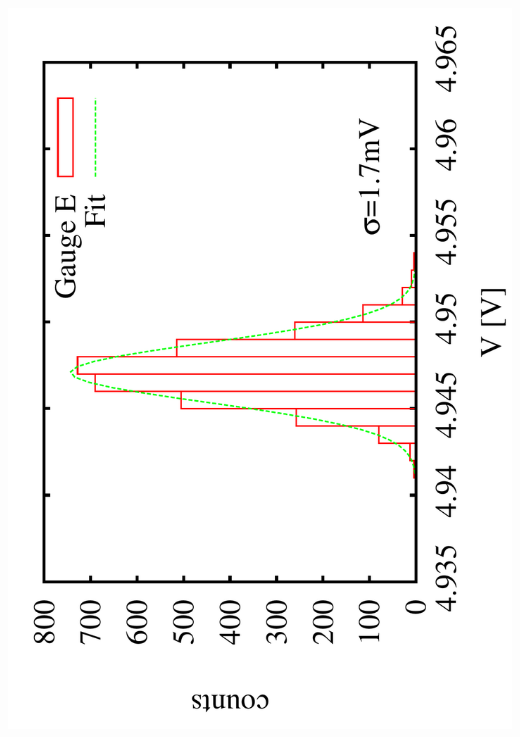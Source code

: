 \documentclass[a4paper,11pt]{book}
\begin{document}
  \includegraphics[scale=0.15,angle=-90]{image_ai_23e1.pdf}
\end{document}

